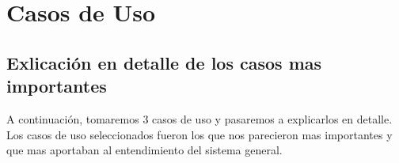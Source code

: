 \newpage
\section{Casos de Uso}





\subsection{Exlicación en detalle de los casos mas importantes}
\label{sec:casosuso_cuadros}
\par A continuación, tomaremos 3 casos de uso y pasaremos a explicarlos en detalle. Los casos de uso seleccionados fueron los que nos parecieron mas importantes y que mas aportaban al entendimiento del sistema general.


